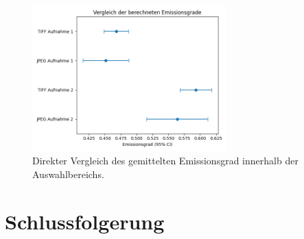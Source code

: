 \documentclass{article}
\begin{document}
\begin{figure}[H]
    \centering
    \captionsetup{width=7cm}
    \includegraphics[width=7.5cm]{img/eps_comp.png}
    \caption{
        Direkter Vergleich des gemittelten Emissionsgrad innerhalb der Auswahlbereichs.
    }
\end{figure}


\section{Schlussfolgerung}
\end{document}
